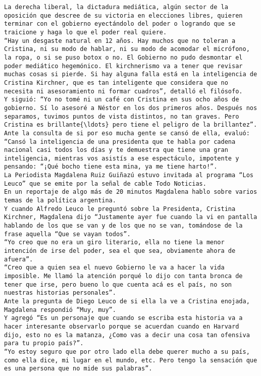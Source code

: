 \documentclass[11pt]{article}
\begin{document}
\begin{Verbatim}[commandchars=\\\{\}]
La derecha liberal, la dictadura mediática, algún sector de la oposición que descree de su victoria en elecciones libres, quieren terminar con el gobierno eyectándolo del poder o logrando que se traicione y haga lo que el poder real quiere.
﻿“Hay un desgaste natural en 12 años. Hay muchos que no toleran a Cristina, ni su modo de hablar, ni su modo de acomodar el micrófono, la ropa, o si se puso botox o no. El Gobierno no pudo desmontar el poder mediático hegemónico. El kirchnerismo va a tener que revisar muchas cosas si pierde. Si hay alguna falla está en la inteligencia de Cristina Kirchner, que es tan inteligente que considera que no necesita ni asesoramiento ni formar cuadros”, detalló el filósofo.
Y siguió: “Yo no tomé ni un café con Cristina en sus ocho años de gobierno. Sí lo asesoré a Néstor en los dos primeros años. Después nos separamos, tuvimos puntos de vista distintos, no tan graves. Pero Cristina es brillante{\ldots} pero tiene el peligro de la brillantez”.
Ante la consulta de si por eso mucha gente se cansó de ella, evaluó: “Cansó la inteligencia de una presidenta que te habla por cadena nacional casi todos los días y te demuestra que tiene una gran inteligencia, mientras vos asistís a ese espectáculo, impotente y pensando: “¡Qué bocho tiene esta mina, ya me tiene harto!”.
﻿La Periodista Magdalena Ruiz Guiñazú estuvo invitada al programa “Los Leuco” que se emite por la señal de cable Todo Noticias.
En un reportaje de algo más de 20 minutos Magdalena hablo sobre varios temas de la política argentina.
Y cuando Alfredo Leuco le preguntó sobre la Presidenta, Cristina Kirchner, Magdalena dijo “Justamente ayer fue cuando la vi en pantalla hablando de los que se van y de los que no se van, tomándose de la frase aquella “Que se vayan todos”.
“Yo creo que no era un giro literario, ella no tiene la menor intención de irse del poder, sea el que sea, obviamente ahora de afuera”.
“Creo que a quien sea el nuevo Gobierno le va a hacer la vida imposible. Me llamó la atención porqué lo dijo con tanta bronca de tener que irse, pero bueno lo que cuenta acá es el país, no son nuestras historias personales”.
Ante la pregunta de Diego Leuco de si ella la ve a Cristina enojada, Magdalena respondió “Muy, muy”.
Y agregó “Es un personaje que cuando se escriba esta historia va a hacer interesante observarlo porque se acuerdan cuando en Harvard dijo, esto no es la matanza, ¿Como vas a decir una cosa tan ofensiva para tu propio país?”.
“Yo estoy seguro que por otro lado ella debe querer mucho a su país, como ella dice, mi lugar en el mundo, etc. Pero tengo la sensación que es una persona que no mide sus palabras”. 

\end{Verbatim}
\end{document}

